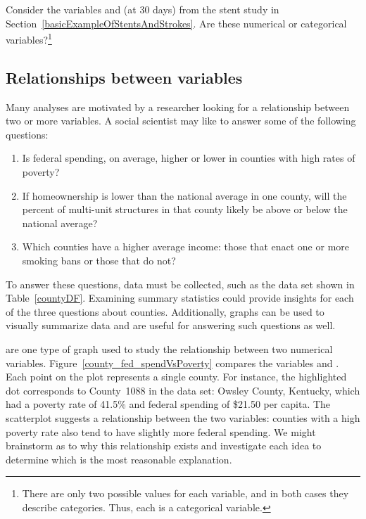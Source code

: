 \begin{exercise} 
Consider the variables  and  (at 30 days) from the stent study in Section~\ref{basicExampleOfStentsAndStrokes}. Are these numerical or categorical variables?\footnote{There are only two possible values for each variable, and in both cases they describe categories. Thus, each is a categorical variable.}
\end{exercise}

\subsection{Relationships between variables}
\label{variableRelations}

Many analyses are motivated by a researcher looking for a relationship between two or more variables. A social scientist may like to answer some of the following questions:
\begin{enumerate}
\setlength{\itemsep}{0mm}
\item[(1)]\label{fedSpendingPovertyQuestion} Is federal spending, on average, higher or lower in counties with high rates of poverty?
\item[(2)]\label{ownershipMultiUnitQuestion} If homeownership is lower than the national average in one county, will the percent of multi-unit structures in that county likely be above or below the national average?
\item[(3)]\label{isAverageIncomeAssociatedWithSmokingBans} Which counties have a higher average income: those that enact one or more smoking bans or those that do not?
\end{enumerate}

To answer these questions, data must be collected, such as the  data set shown in Table~\ref{countyDF}. Examining summary statistics  could provide insights for each of the three questions about counties. Additionally, graphs can be used to visually summarize data and are useful for answering such questions as well.

 are one type of graph used to study the relationship between two numerical variables. Figure~\ref{county_fed_spendVsPoverty} compares the variables  and . Each point on the plot represents a single county. For instance, the highlighted dot corresponds to County~1088 in the  data set: Owsley County, Kentucky, which had a poverty rate of 41.5\% and federal spending of \$21.50 per capita. The scatterplot suggests a relationship between the two variables: counties with a high poverty rate also tend to have slightly more federal spending. We might brainstorm as to why this relationship exists and investigate each idea to determine which is the most reasonable explanation.

